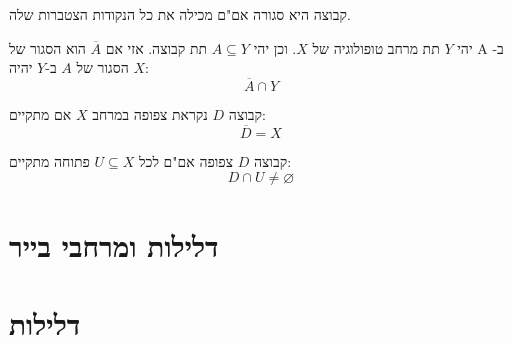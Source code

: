 \documentclass{tstextbook}
\begin{document}
\begin{corollary}
קבוצה היא סגורה אם"ם מכילה את כל הנקודות הצטברות שלה.

\end{corollary}
\begin{proposition}
יהי \(Y\) תת מרחב טופולוגיה של \(X\). וכן יהי \(A\subseteq Y\) תת קבוצה. אזי אם \(\overline{A}\) הוא הסגור של A ב-\(X\) הסגור של \(A\) ב-\(Y\) יהיה:
$$\overline{A} \cap  Y$$

\end{proposition}
\begin{definition}
קבוצה \(D\) נקראת צפופה במרחב \(X\) אם מתקיים:
$$\overline{D} =X$$

\end{definition}
\begin{proposition}
קבוצה \(D\) צפופה אם"ם לכל \(U\subseteq X\) פתוחה מתקיים:
$$D\cap U\neq \varnothing $$

\end{proposition}
\section{דלילות ומרחבי בייר}

\section{דלילות}
\end{document}
